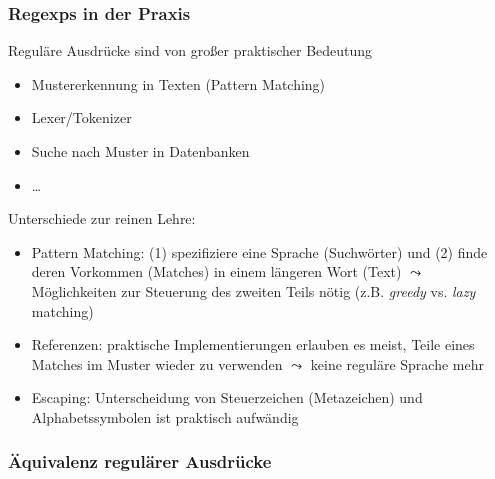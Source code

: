 \documentclass[onlymath]{beamer}
\begin{document}
\begin{frame}\frametitle{Regexps in der Praxis}

Reguläre Ausdrücke sind von großer praktischer Bedeutung
\begin{itemize}
\item Mustererkennung in Texten (Pattern Matching)
\item Lexer/Tokenizer
\item Suche nach Muster in Datenbanken
\item \ldots
\end{itemize}

Unterschiede zur reinen Lehre:
\begin{itemize}
\item \alert{Pattern Matching:} (1) spezifiziere eine Sprache (Suchwörter) und (2) finde deren Vorkommen (Matches) in einem längeren Wort (Text) $\leadsto$ Möglichkeiten zur Steuerung des zweiten Teils nötig (z.B. \emph{greedy} vs. \emph{lazy} matching)
\item \alert{Referenzen:} praktische Implementierungen erlauben es meist, Teile eines Matches im Muster wieder zu verwenden $\leadsto$ keine reguläre Sprache mehr
\item \alert{Escaping:} Unterscheidung von Steuerzeichen (Metazeichen) und Alphabetssymbolen ist praktisch aufwändig
\end{itemize}

\end{frame}

\begin{frame}\frametitle{Äquivalenz regulärer Ausdrücke}

\medskip


\end{frame}
\end{document}
